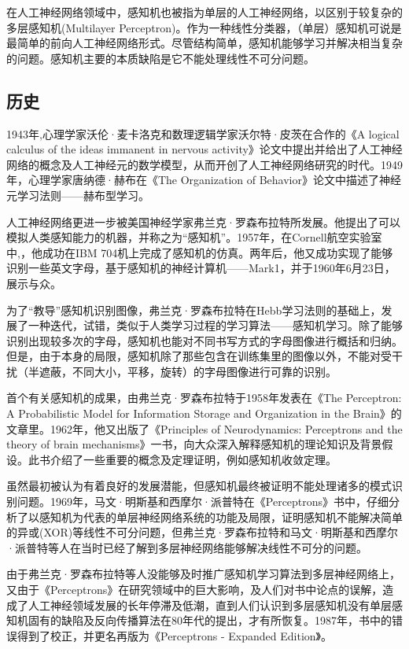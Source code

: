 \documentclass[a4paper,8pt]{article}
\begin{document}
在人工神经网络领域中，感知机也被指为单层的人工神经网络，以区别于较复杂的多层感知机(Multilayer Perceptron)。作为一种线性分类器，（单层）感知机可说是最简单的前向人工神经网络形式。尽管结构简单，感知机能够学习并解决相当复杂的问题。感知机主要的本质缺陷是它不能处理线性不可分问题。

\subsection{历史}
1943年,心理学家沃伦·麦卡洛克和数理逻辑学家沃尔特·皮茨在合作的《A logical calculus of the ideas immanent in nervous activity》论文中提出并给出了人工神经网络的概念及人工神经元的数学模型，从而开创了人工神经网络研究的时代。1949年，心理学家唐纳德·赫布在《The Organization of Behavior》论文中描述了神经元学习法则——赫布型学习。

人工神经网络更进一步被美国神经学家弗兰克·罗森布拉特所发展。他提出了可以模拟人类感知能力的机器，并称之为“感知机”。1957年，在Cornell航空实验室中,，他成功在IBM 704机上完成了感知机的仿真。两年后，他又成功实现了能够识别一些英文字母，基于感知机的神经计算机——Mark1，并于1960年6月23日，展示与众。

为了“教导”感知机识别图像，弗兰克·罗森布拉特在Hebb学习法则的基础上，发展了一种迭代，试错，类似于人类学习过程的学习算法——感知机学习。除了能够识别出现较多次的字母，感知机也能对不同书写方式的字母图像进行概括和归纳。但是，由于本身的局限，感知机除了那些包含在训练集里的图像以外，不能对受干扰（半遮蔽，不同大小，平移，旋转）的字母图像进行可靠的识别。

首个有关感知机的成果，由弗兰克·罗森布拉特于1958年发表在《The Perceptron: A Probabilistic Model for Information Storage and Organization in the Brain》的文章里。1962年，他又出版了《Principles of Neurodynamics: Perceptrons and the theory of brain mechanisms》一书，向大众深入解释感知机的理论知识及背景假设。此书介绍了一些重要的概念及定理证明，例如感知机收敛定理。

虽然最初被认为有着良好的发展潜能，但感知机最终被证明不能处理诸多的模式识别问题。1969年，马文·明斯基和西摩尔·派普特在《Perceptrons》书中，仔细分析了以感知机为代表的单层神经网络系统的功能及局限，证明感知机不能解决简单的异或(XOR)等线性不可分问题，但弗兰克·罗森布拉特和马文·明斯基和西摩尔·派普特等人在当时已经了解到多层神经网络能够解决线性不可分的问题。

由于弗兰克·罗森布拉特等人没能够及时推广感知机学习算法到多层神经网络上，又由于《Perceptrons》在研究领域中的巨大影响，及人们对书中论点的误解，造成了人工神经领域发展的长年停滞及低潮，直到人们认识到多层感知机没有单层感知机固有的缺陷及反向传播算法在80年代的提出，才有所恢复。1987年，书中的错误得到了校正，并更名再版为《Perceptrons - Expanded Edition》。
\end{document}
